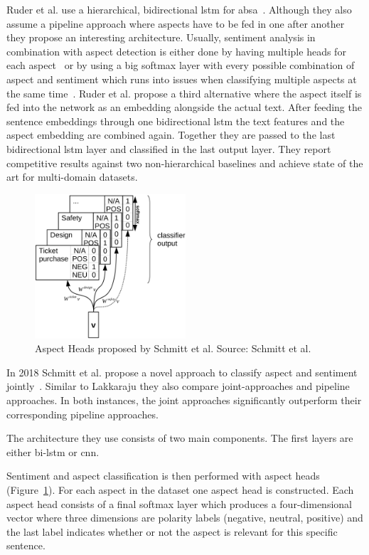Ruder et al. use a hierarchical, bidirectional \gls{lstm} for \gls{absa}~\cite{Ruder2016}. Although they also assume a pipeline approach where aspects have to be fed in one after another they propose an interesting architecture. Usually, sentiment analysis in combination with aspect detection is either done by having multiple heads for each aspect~\cite{Schmitt2018} or by using a big softmax layer with every possible combination of aspect and sentiment which runs into issues when classifying multiple aspects at the same time~\cite{Lakkaraju2014}. Ruder et al. propose a third alternative where the aspect itself is fed into the network as an embedding alongside the actual text. After feeding the sentence embeddings through one bidirectional \gls{lstm} the text features and the aspect embedding are combined again. Together they are passed to the last bidirectional \gls{lstm} layer and classified in the last output layer. They report competitive results against two non-hierarchical baselines and achieve state of the art for multi-domain datasets.
\medskip
\begin{figure}[htp]
    \centering
    \includegraphics[width=0.5\textwidth]{figures/02_relatedWork/02_jabsa}
    \caption{Aspect Heads proposed by Schmitt et al. Source: Schmitt et al.~\cite{Schmitt2018}}
    \label{fig:02_j-absa}
\end{figure}

In 2018 Schmitt et al. propose a novel approach to classify aspect and sentiment jointly~\cite{Schmitt2018}. Similar to Lakkaraju they also compare joint-approaches and pipeline approaches. In both instances, the joint approaches significantly outperform their corresponding pipeline approaches. 

The architecture they use consists of two main components. The first layers are either bi-\gls{lstm} or \gls{cnn}. 

Sentiment and aspect classification is then performed with aspect heads {(Figure~\ref{fig:02_j-absa})}. For each aspect in the dataset one aspect head is constructed. Each aspect head consists of a final softmax layer which produces a four-dimensional vector where three dimensions are polarity labels {(negative, neutral, positive)} and the last label indicates whether or not the aspect is relevant for this specific sentence. 
\medskip

